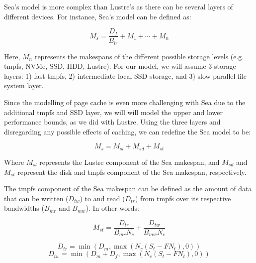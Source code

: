 \documentclass[10pt,journal,compsoc]{IEEEtran}
\begin{document}
      Sea's model is more complex than Lustre's as there can be several
      layers of different devices. For instance, Sea's model can be defined as:

      \begin{equation}\label{eq:sea}
          M_{s} = \frac{D_{I}}{B_{lr}} + M_{1} + \cdots + M_{n}
      \end{equation}

      Here, $M_{n}$ represents the makespans of the different possible storage levels
      (e.g. tmpfs, NVMe, SSD, HDD, Lustre). For our model, we will assume 3 storage layers:
      1) fast tmpfs, 2) intermediate local SSD storage, and 3) slow parallel file system layer.

      Since the modelling of page cache is even more challenging with Sea due to the additional tmpfs
      and SSD layer, we will will model the upper and lower performance bounds, as we did with Lustre.
      Using the three layers and disregarding any possible effects of caching, we can redefine the
      Sea model to be:

      \begin{equation}\label{eq:snc}
          M_{s} = M_{sl} + M_{sd} + M_{st}
      \end{equation}

         Where $M_{sl}$ represents the Lustre component of the Sea makespan, and
      $M_{sd}$ and $M_{st}$ represent the disk and tmpfs component of the Sea
      makespan, respectively.

      The tmpfs component of the Sea makespan can be defined as the amount of
      data that can be written ($D_{tw}$) to and read ($D_{tr}$) from tmpfs
      over its respective bandwidths ($B_{mr}$ and $B_{mw}$). In other words:

      \begin{equation}\label{eq:mst}
          M_{st} = \frac{D_{tr}}{B_{mr}N_{c}} + \frac{D_{tw}}{B_{mw}N_{c}}
      \end{equation}

      \begin{equation*}\label{eq:dtr}
          D_{tr} = \min\left(D_{m}, \max{\left(N_{c}(S_{t} - FN_{t}), 0 \right)} \right)
      \end{equation*}
      \begin{equation*}\label{eq:dtw}
          D_{tw} = \min\left(D_{m} + D_{f}, \max{\left(N_{c}(S_{t} - FN_{t}), 0 \right)} \right)
      \end{equation*}
\end{document}
